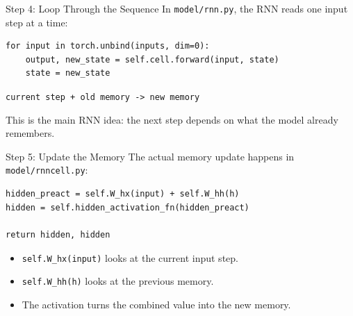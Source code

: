 \documentclass{beamer}
\begin{document}
\begin{frame}[fragile]{Step 4: Loop Through the Sequence}
\small
In \texttt{model/rnn.py}, the RNN reads one input step at a time:

\vspace{0.15cm}

\begin{verbatim}
for input in torch.unbind(inputs, dim=0):
    output, new_state = self.cell.forward(input, state)
    state = new_state
\end{verbatim}

\vspace{0.2cm}

\begin{center}
\texttt{current step + old memory -> new memory}
\end{center}

\vspace{0.15cm}

This is the main RNN idea: the next step depends on what the model already remembers.
\end{frame}

\begin{frame}[fragile]{Step 5: Update the Memory}
\small
The actual memory update happens in \texttt{model/rnncell.py}:

\vspace{0.15cm}

\begin{verbatim}
hidden_preact = self.W_hx(input) + self.W_hh(h)
hidden = self.hidden_activation_fn(hidden_preact)

return hidden, hidden
\end{verbatim}

\vspace{0.15cm}

\begin{itemize}
    \item \texttt{self.W\_hx(input)} looks at the current input step.
    \item \texttt{self.W\_hh(h)} looks at the previous memory.
    \item The activation turns the combined value into the new memory.
\end{itemize}
\end{frame}
\end{document}
